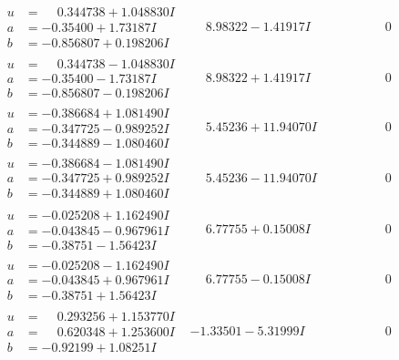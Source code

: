 \documentclass[1p]{elsarticle_modified}
\theoremstyle{definition}
\begin{document}
$$\begin{array}{c|c|c}
\begin{aligned}
u &= \phantom{-}0.344738 + 1.048830 I \\
a &= -0.35400 + 1.73187 I \\
b &= -0.856807 + 0.198206 I\end{aligned}
 & \phantom{-}8.98322 - 1.41917 I & \phantom{-0.000000 } 0 \\ \hline\begin{aligned}
u &= \phantom{-}0.344738 - 1.048830 I \\
a &= -0.35400 - 1.73187 I \\
b &= -0.856807 - 0.198206 I\end{aligned}
 & \phantom{-}8.98322 + 1.41917 I & \phantom{-0.000000 } 0 \\ \hline\begin{aligned}
u &= -0.386684 + 1.081490 I \\
a &= -0.347725 - 0.989252 I \\
b &= -0.344889 - 1.080460 I\end{aligned}
 & \phantom{-}5.45236 + 11.94070 I & \phantom{-0.000000 } 0 \\ \hline\begin{aligned}
u &= -0.386684 - 1.081490 I \\
a &= -0.347725 + 0.989252 I \\
b &= -0.344889 + 1.080460 I\end{aligned}
 & \phantom{-}5.45236 - 11.94070 I & \phantom{-0.000000 } 0 \\ \hline\begin{aligned}
u &= -0.025208 + 1.162490 I \\
a &= -0.043845 - 0.967961 I \\
b &= -0.38751 - 1.56423 I\end{aligned}
 & \phantom{-}6.77755 + 0.15008 I & \phantom{-0.000000 } 0 \\ \hline\begin{aligned}
u &= -0.025208 - 1.162490 I \\
a &= -0.043845 + 0.967961 I \\
b &= -0.38751 + 1.56423 I\end{aligned}
 & \phantom{-}6.77755 - 0.15008 I & \phantom{-0.000000 } 0 \\ \hline\begin{aligned}
u &= \phantom{-}0.293256 + 1.153770 I \\
a &= \phantom{-}0.620348 + 1.253600 I \\
b &= -0.92199 + 1.08251 I\end{aligned}
 & -1.33501 - 5.31999 I & \phantom{-0.000000 } 0 \\ \hline\begin{aligned}

\end{aligned}
\end{array}$$
\end{document}
